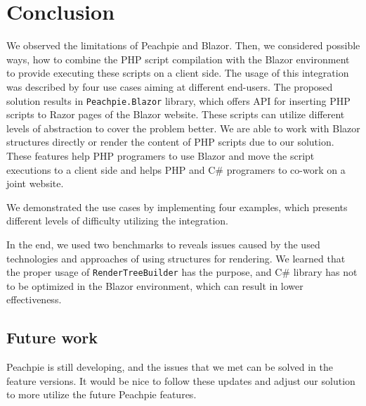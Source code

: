 \chapter*{Conclusion}

We observed the limitations of Peachpie and Blazor.
Then, we considered possible ways, how to combine the PHP script compilation with the Blazor environment to provide executing these scripts on a client side.
The usage of this integration was described by four use cases aiming at different end-users.
The proposed solution results in \texttt{Peachpie.Blazor} library, which offers API for inserting PHP scripts to Razor pages of the Blazor website.
These scripts can utilize different levels of abstraction to cover the problem better.
We are able to work with Blazor structures directly or render the content of PHP scripts due to our solution.
These features help PHP programers to use Blazor and move the script executions to a client side and helps PHP and C\# programers to co-work on a joint website.
\par
We demonstrated the use cases by implementing four examples, which presents different levels of difficulty utilizing the integration.
\par
In the end, we used two benchmarks to reveals issues caused by the used technologies and approaches of using structures for rendering.
We learned that the proper usage of \texttt{RenderTreeBuilder} has the purpose, and C\# library has not to be optimized in the Blazor environment, which can result in lower effectiveness.

\section*{Future work}

Peachpie is still developing, and the issues that we met can be solved in the feature versions.
It would be nice to follow these updates and adjust our solution to more utilize the future Peachpie features.
